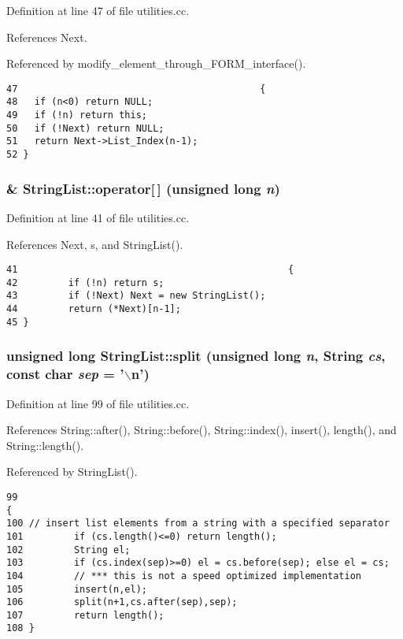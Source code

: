 Definition at line 47 of file utilities.cc.

References Next.

Referenced by modify\_\-element\_\-through\_\-FORM\_\-interface().



\footnotesize\begin{verbatim}47                                           {
48   if (n<0) return NULL;
49   if (!n) return this;
50   if (!Next) return NULL;
51   return Next->List_Index(n-1);
52 }
\end{verbatim}\normalsize 
{}
\subsubsection{ \& String\-List::operator[$\,$] (unsigned long {\em n})}\label{classStringList_a5}




Definition at line 41 of file utilities.cc.

References Next, s, and String\-List().



\footnotesize\begin{verbatim}41                                                {
42         if (!n) return s;
43         if (!Next) Next = new StringList();
44         return (*Next)[n-1];
45 }
\end{verbatim}\normalsize 
{}
\subsubsection{\setlength{\rightskip}{0pt plus 5cm}unsigned long String\-List::split (unsigned long {\em n}, {\bf String} {\em cs}, const char {\em sep} = '$\backslash$n')}\label{classStringList_a14}




Definition at line 99 of file utilities.cc.

References String::after(), String::before(), String::index(), insert(), length(), and String::length().

Referenced by String\-List().



\footnotesize\begin{verbatim}99                                                                                  {
100 // insert list elements from a string with a specified separator
101         if (cs.length()<=0) return length();
102         String el;
103         if (cs.index(sep)>=0) el = cs.before(sep); else el = cs;
104         // *** this is not a speed optimized implementation
105         insert(n,el);
106         split(n+1,cs.after(sep),sep);
107         return length();
108 }
\end{verbatim}\normalsize 


